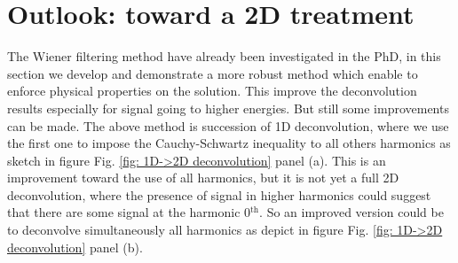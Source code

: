 \section{\texorpdfstring{Outlook: toward a 2D treatment}{Outlook: toward a 2D treatment}}


The Wiener filtering method have already been investigated in the PhD\cite{marguerite2017two}, in this section we develop and demonstrate a more robust method which enable to enforce physical properties on the solution. This improve the deconvolution results especially for signal going to higher energies. But still some improvements can be made. The above method is succession of 1D deconvolution, where we use the first one to impose the Cauchy-Schwartz inequality to all others harmonics as sketch in figure Fig. \ref{fig: 1D->2D deconvolution} panel (a). This is an improvement toward the use of all harmonics, but it is not yet a full 2D deconvolution, where the presence of signal in higher harmonics could suggest that there are some signal at the harmonic 0$^{\mathrm{th}}$. So an improved version could be to deconvolve simultaneously all harmonics as depict in figure Fig. \ref{fig: 1D->2D deconvolution} panel (b).

